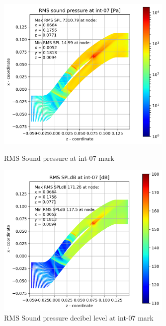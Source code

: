 \begin{figure}[ht]
  \centering
  \includegraphics[width=0.75\textwidth]{Figures/int-07-rms-spl.png}
  \caption{RMS Sound pressure at int-07 mark} \label{int-07-rms-spl}
  
  \vspace*{\floatsep}%

  \includegraphics[width=0.75\textwidth]{Figures/int-07-rms-spldb.png}
  \caption{RMS Sound pressure decibel level at int-07 mark} \label{int-07-rms-spldb}
\end{figure}
